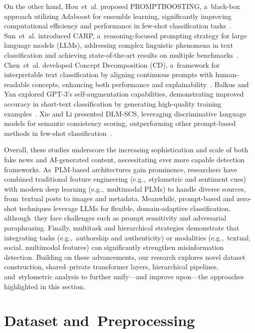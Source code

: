 \documentclass[electronics,article,accept,pdftex,moreauthors,electronics]{Definitions/mdpi}
\begin{document}
On the other hand, Hou~et~al. proposed PROMPTBOOSTING, a~black-box approach utilizing Adaboost for ensemble learning, significantly improving computational efficiency and performance in few-shot classification tasks~\cite{hou_promptboosting_2023}. Sun~et~al. introduced CARP, a~reasoning-focused prompting strategy for large language models (LLMs), addressing complex linguistic phenomena in text classification and achieving state-of-the-art results on multiple benchmarks~\cite{sun_text_2023}. Chen~et~al. developed Concept Decomposition (CD), a~framework for interpretable text classification by aligning continuous prompts with human-readable concepts, enhancing both performance and explainability~\cite{chen_concept_2024}. Balkus and Yan explored GPT-3's self-augmentation capabilities, demonstrating improved accuracy in short-text classification by generating high-quality training examples~\cite{balkus_improving_2024}. Xie and Li presented DLM-SCS, leveraging discriminative language models for semantic consistency scoring, outperforming other prompt-based methods in few-shot classification~\cite{xie_discriminative_2022}.

Overall, these studies underscore the increasing sophistication and scale of both fake news and AI-generated content, necessitating ever more capable detection frameworks. As~PLM-based architectures gain prominence, researchers have combined traditional feature engineering (e.g.,~stylometric and sentiment cues) with modern deep learning (e.g.,~multimodal PLMs) to handle diverse sources, from~textual posts to images and metadata. Meanwhile, prompt-based and zero-shot techniques leverage LLMs for flexible, domain-adaptive classification, although~they face challenges such as prompt sensitivity and adversarial paraphrasing. Finally, multitask and hierarchical strategies demonstrate that integrating tasks (e.g.,~authorship and authenticity) or modalities (e.g.,~textual, social, multimodal features) can significantly strengthen misinformation detection. Building on these advancements, our research explores novel dataset construction, shared--private transformer layers, hierarchical pipelines, and~stylometric analysis to further unify---and improve upon---the approaches highlighted in this section.


\vspace{-3pt}

\section{Dataset and~Preprocessing}\label{S3}
\end{document}
